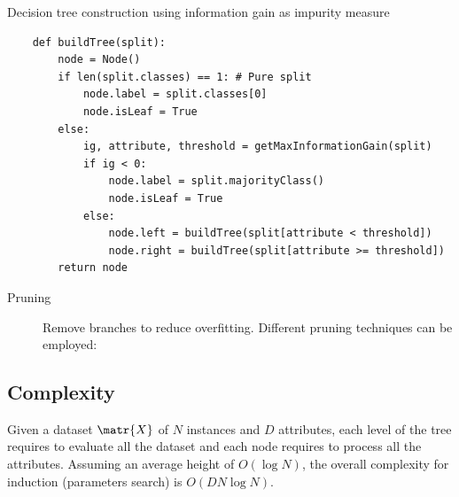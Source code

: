 \begin{algorithm}[H]
\caption{Decision tree construction using information gain as impurity measure}
\begin{lstlisting}
    def buildTree(split):
        node = Node()
        if len(split.classes) == 1: # Pure split
            node.label = split.classes[0]
            node.isLeaf = True
        else:
            ig, attribute, threshold = getMaxInformationGain(split)
            if ig < 0:
                node.label = split.majorityClass()
                node.isLeaf = True
            else:
                node.left = buildTree(split[attribute < threshold])
                node.right = buildTree(split[attribute >= threshold])
        return node
\end{lstlisting}
\end{algorithm}

\begin{description}
    \item[Pruning] 
        Remove branches to reduce overfitting.
        Different pruning techniques can be employed:
\end{description}


\subsection{Complexity}
Given a dataset $\matr{X}$ of $N$ instances and $D$ attributes,
each level of the tree requires to evaluate all the dataset and
each node requires to process all the attributes.
Assuming an average height of $O(\log N)$, 
the overall complexity for induction (parameters search) is $O(DN \log N)$.

